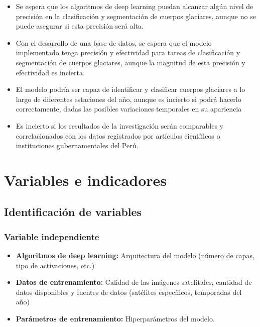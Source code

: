 \begin{itemize}
	\item Se espera que los algoritmos de deep learning puedan alcanzar algún nivel de precisión en la clasificación y segmentación de cuerpos glaciares, aunque no se puede asegurar si esta precisión será alta.
	\item Con el desarrollo de una base de datos, se espera que el modelo implementado tenga precisión y efectividad para tareas de clasificación y segmentación de cuerpos glaciares, aunque la magnitud de esta precisión y efectividad es incierta.
	\item El modelo podría ser capaz de identificar y clasificar cuerpos glaciares a lo largo de diferentes estaciones del año, aunque es incierto si podrá hacerlo correctamente, dadas las posibles variaciones temporales en su apariencia
	
	\item Es incierto si los resultados de la investigación serán comparables y correlacionados con los datos registrados por artículos científicos o instituciones gubernamentales del Perú.
\end{itemize}

\section{Variables e indicadores}
\subsection{Identificación de variables}
\subsubsection{Variable independiente}
\begin{itemize}
	\item \textbf{Algoritmos de deep learning:} Arquitectura del modelo (número de capas, tipo de activaciones, etc.)
	
	\item \textbf{Datos de entrenamiento:} Calidad de las imágenes satelitales,  cantidad de datos disponibles y fuentes de datos (satélites específicos, temporadas del año)
	
	\item \textbf{Parámetros de entrenamiento:} Hiperparámetros del modelo.
	
\end{itemize}

